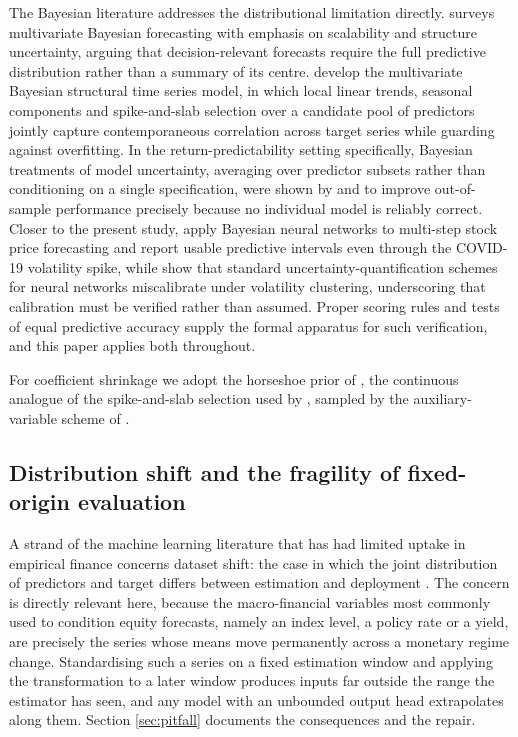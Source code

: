 The Bayesian literature addresses the distributional limitation directly.
\citet{west2020bayesian} surveys multivariate Bayesian forecasting with emphasis
on scalability and structure uncertainty, arguing that decision-relevant
forecasts require the full predictive distribution rather than a summary of its
centre. \citet{qiu2018multivariate} develop the multivariate Bayesian structural
time series model, in which local linear trends, seasonal components and
spike-and-slab selection over a candidate pool of predictors jointly capture
contemporaneous correlation across target series while guarding against
overfitting. In the return-predictability setting specifically, Bayesian
treatments of model uncertainty, averaging over predictor subsets rather than
conditioning on a single specification, were shown by \citet{avramov2002stock}
and \citet{cremers2002stock} to improve out-of-sample performance precisely
because no individual model is reliably correct. Closer to the present study,
\citet{chandra2021bayesian} apply Bayesian neural networks to multi-step stock
price forecasting and report usable predictive intervals even through the
COVID-19 volatility spike, while \citet{wong2024quantifying} show that standard
uncertainty-quantification schemes for neural networks miscalibrate under
volatility clustering, underscoring that calibration must be verified rather than
assumed. Proper scoring rules \citep{gneiting2007strictly} and tests of equal
predictive accuracy \citep{diebold1995comparing} supply the formal apparatus for
such verification, and this paper applies both throughout.

For coefficient shrinkage we adopt the horseshoe prior of
\citet{carvalho2010horseshoe}, the continuous analogue of the spike-and-slab
selection used by \citet{qiu2018multivariate}, sampled by the auxiliary-variable
scheme of \citet{makalic2016simple}.

\subsection{Distribution shift and the fragility of fixed-origin evaluation}

A strand of the machine learning literature that has had limited uptake in
empirical finance concerns dataset shift: the case in which the joint
distribution of predictors and target differs between estimation and deployment
\citep{quinonero2009dataset}. The concern is directly relevant here, because the
macro-financial variables most commonly used to condition equity forecasts, namely an
index level, a policy rate or a yield, are precisely the series whose means move
permanently across a monetary regime change. Standardising such a series on a
fixed estimation window and applying the transformation to a later window
produces inputs far outside the range the estimator has seen, and any model with
an unbounded output head extrapolates along them. Section
\ref{sec:pitfall} documents the consequences and the repair.

